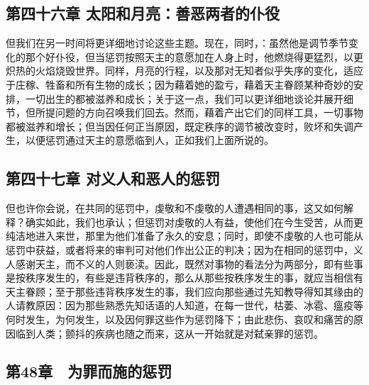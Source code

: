 
\subsection{第四十六章 太阳和月亮：善恶两者的仆役}

但我们在另一时间将更详细地讨论这些主题。现在，同时，：虽然他是调节季节变化的那个好仆役，但当惩罚按照天主的意愿加在人身上时，他燃烧得更猛烈，以更炽热的火焰烧毁世界。同样，月亮的行程，以及那对无知者似乎失序的变化，适应于庄稼、牲畜和所有生物的成长；因为藉着她的盈亏，藉着天主眷顾某种奇妙的安排，一切出生的都被滋养和成长；关于这一点，我们可以更详细地谈论并展开细节，但所提问题的方向召唤我们回去。然而，藉着产出它们的同样工具，一切事物都被滋养和增长；但当因任何正当原因，既定秩序的调节被改变时，败坏和失调产生，以便惩罚通过天主的意愿临到人，正如我们上面所说的。\par


\subsection{第四十七章 对义人和恶人的惩罚}

但也许你会说，在共同的惩罚中，虔敬和不虔敬的人遭遇相同的事，这又如何解释？确实如此，我们也承认；但惩罚对虔敬的人有益，使他们在今生受苦，从而更纯洁地进入来世，那里为他们准备了永久的安息；同时，即使不虔敬的人也可能从惩罚中获益，或者将来的审判可对他们作出公正的判决；因为在相同的惩罚中，义人感谢天主，而不义的人则亵渎。因此，既然对事物的看法分为两部分，即有些事是按秩序发生的，有些是违背秩序的，那么从那些按秩序发生的事，就应当相信有天主眷顾；至于那些违背秩序发生的事，我们应向那些通过先知教导得知其缘由的人请教原因：因为那些熟悉先知话语的人知道，在每一世代，枯萎、冰雹、瘟疫等何时发生，为何发生，以及因何罪这些作为惩罚降下；由此悲伤、哀叹和痛苦的原因临到人类；颤抖的疾病也随之而来，这从一开始就是对弑亲罪的惩罚。\par


\subsection{第48章　为罪而施的惩罚}

\par

